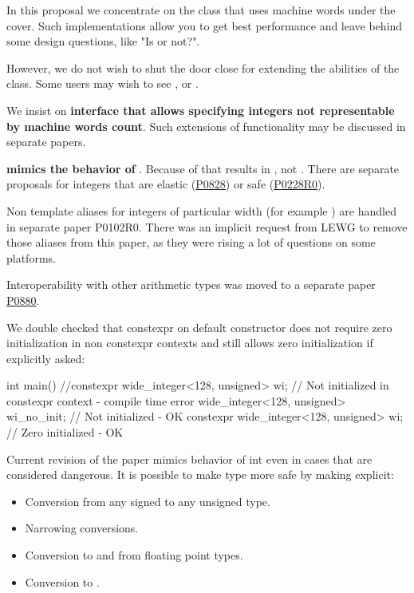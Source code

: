 \documentclass[ebook,10pt,oneside,openany,final]{memoir}
\begin{document}
In this proposal we concentrate on the  class that uses machine words under the cover. Such implementations allow you to get best performance and leave behind some design questions, like "Is  or not?".

However, we do not wish to shut the door close for extending the abilities of the  class. Some users may wish to see , or .

We insist on \textbf{interface that allows specifying integers not representable by machine words count}. Such extensions of functionality may be discussed in separate papers.

\textbf{ mimics the behavior of }. Because of that  results in , not . There are separate proposals for integers that are elastic (\href{https://wg21.link/P0828}{P0828}) or safe (\href{https://wg21.link/P0228R0}{P0228R0}).

Non template aliases for integers of particular width (for example ) are handled in separate paper P0102R0. There was an implicit request from LEWG to remove those aliases from this paper, as they were rising a lot of questions on some platforms.

Interoperability with other arithmetic types was moved to a separate paper \href{https://wg21.link/P0880}{P0880}.

We double checked that constexpr on default constructor does not require zero initialization in non constexpr contexts and still allows zero initialization if explicitly asked:
\begin{codeblock}
int main() {
     //constexpr wide_integer<128, unsigned> wi;   // Not initialized in constexpr context - compile time error
     wide_integer<128, unsigned> wi_no_init;       // Not initialized - OK
     constexpr wide_integer<128, unsigned> wi{};   // Zero initialized - OK
}
\end{codeblock}

Current revision of the paper mimics behavior of int even in cases that are considered dangerous. It is possible to make  type more safe by making explicit:
\begin{itemize}
\item Conversion from any signed to any unsigned type.
\item Narrowing conversions.
\item Conversion to and from floating point types.
\item Conversion to .
\end{itemize}
\end{document}
